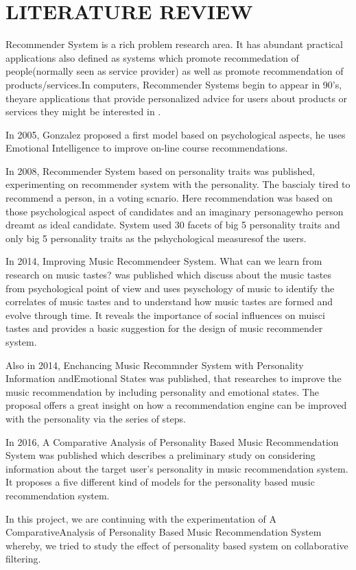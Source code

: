 \newpage
\section{LITERATURE REVIEW}
Recommender System is a rich problem research area. It has abundant practical applications also defined as systems which promote recommedation of people(normally seen as service provider) as well as promote recommendation of products/services.In computers, Recommender Systems begin to appear in 90's, theyare applications that provide personalized advice for users about products or services they might be interested in \cite{resnick}.

In 2005, Gonzalez \cite{gonzalez} proposed a first model based on psychological aspects, he uses Emotional Intelligence to improve on-line course recommendations.

In 2008, Recommender System based on personality traits \cite{nunes} was published, experimenting on recommender system with the personality. The bascialy tired to recommend a person, in a voting scnario. Here recommendation was based on those psychological aspect of candidates and an imaginary personagewho person dreamt as ideal candidate. System used 30 facets of big 5 personality traits and only big 5 personality traits as the pshychological measuresof the users.

In 2014, Improving Music Recommendeer System. What can we learn from research on music tastes? \cite{laplante} was published which discuss about the music tastes from psychological point of view and uses psyschology of music to identify the correlates of music tastes and to understand how music tastes are formed and evolve through time. It reveals the importance of social influences on muisci tastes and provides a basic suggestion for the design of music recommender system.

Also in 2014, Enchancing Music Recommnder System with Personality Information andEmotional States \cite{bruce} was published, that researches to improve the music recommendation by including personality and emotional states. The proposal offers a great insight on how a recommendation engine can be improved with the personality via the series of steps.

In 2016, A Comparative Analysis of Personality Based Music Recommendation System \cite{melissa} was published which describes a preliminary study on considering information about the target user's personality in music recommendation system. It proposes a five different kind of models for the personality based music recommendation system.

In this project, we are continuing with the experimentation of A ComparativeAnalysis of Personality Based Music Recommendation System whereby, we tried to study the effect of personality based system on collaborative filtering.
